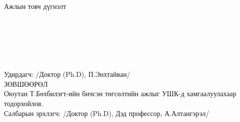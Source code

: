 \documentclass[12pt, a4paper]{report}
\newcommand{\authorshort}{Т.Бөхбилэгт}
\newcommand{\supervisor}{Доктор (Ph.D), П.Энхтайван}
\newcommand{\deptchair}{Доктор (Ph.D), Дэд профессор, А.Алтангэрэл}
\begin{document}
\begin{titlepage}
\begin{center}
\vspace{0.8cm}
Ажлын товч дүгнэлт \\[0.4cm]
\dotfill \\[0.2cm]
\dotfill \\[0.2cm]
\dotfill \\[0.2cm]
\dotfill \\[0.2cm]
\dotfill \\[0.2cm]
\dotfill \\[0.4cm]
Удирдагч: \makebox[3cm]{\dotfill} /\supervisor/ \\

\vspace{1.5cm}
ЗӨВШӨӨРӨЛ \\[0.4cm]
Оюутан \authorshort-ийн бичсэн төгсөлтийн ажлыг УШК-д хамгаалуулахаар тодорхойлов.\\[0.4cm]
Салбарын эрхлэгч: \makebox[3cm]{\dotfill} /\deptchair/

\end{center}

\end{titlepage}

\newpage
\end{document}
